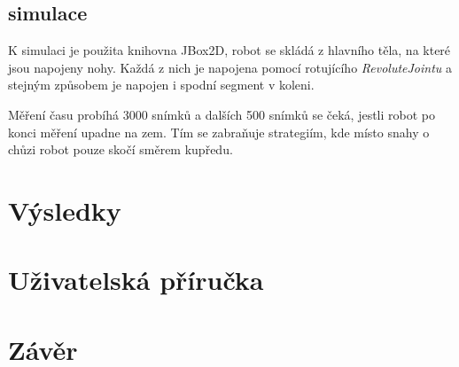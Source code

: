 \documentclass[a4]{article}
\begin{document}
\subsection{simulace}
K simulaci je použita knihovna JBox2D\cite{jbox2D}, robot se skládá z hlavního těla, na které jsou napojeny nohy. Každá z nich je napojena pomocí rotujícího \emph{RevoluteJointu} a stejným způsobem je napojen i spodní segment v koleni.\par
Měření času probíhá 3000 snímků a dalších 500 snímků se čeká, jestli robot po konci měření upadne na zem. Tím se zabraňuje strategiím, kde místo snahy o chůzi robot pouze skočí směrem kupředu.
\section{Výsledky} 
\section{Uživatelská příručka}
\section{Závěr} 
\end{document}
